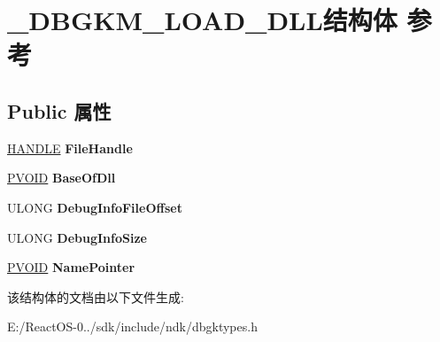 \hypertarget{struct___d_b_g_k_m___l_o_a_d___d_l_l}{}\section{\+\_\+\+D\+B\+G\+K\+M\+\_\+\+L\+O\+A\+D\+\_\+\+D\+L\+L结构体 参考}
\label{struct___d_b_g_k_m___l_o_a_d___d_l_l}
\subsection*{Public 属性}
\begin{DoxyCompactItemize}
\item 
\mbox{\label{struct___d_b_g_k_m___l_o_a_d___d_l_l_a9132c27ff224c9f5fade37f34dd432a8}} 
\hyperlink{interfacevoid}{H\+A\+N\+D\+LE} {\bfseries File\+Handle}
\item 
\mbox{\label{struct___d_b_g_k_m___l_o_a_d___d_l_l_a8e0863554a60b8d7a0b9cf80df130e81}} 
\hyperlink{interfacevoid}{P\+V\+O\+ID} {\bfseries Base\+Of\+Dll}
\item 
\mbox{\label{struct___d_b_g_k_m___l_o_a_d___d_l_l_abf1eeb592df8cf94d5d09ce0bdc0833d}} 
U\+L\+O\+NG {\bfseries Debug\+Info\+File\+Offset}
\item 
\mbox{\label{struct___d_b_g_k_m___l_o_a_d___d_l_l_ae4e34d5a2e5e501465ff8b537586f025}} 
U\+L\+O\+NG {\bfseries Debug\+Info\+Size}
\item 
\mbox{\label{struct___d_b_g_k_m___l_o_a_d___d_l_l_a93046df4b72de1f6a6f241d71afa517d}} 
\hyperlink{interfacevoid}{P\+V\+O\+ID} {\bfseries Name\+Pointer}
\end{DoxyCompactItemize}


该结构体的文档由以下文件生成\+:\begin{DoxyCompactItemize}
\item 
E\+:/\+React\+O\+S-\/0../sdk/include/ndk/dbgktypes.\+h\end{DoxyCompactItemize}
